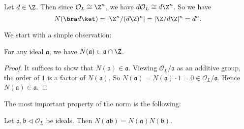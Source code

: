 \documentclass[a4paper]{article}
\begin{document}
\begin{eg}
  Let $d \in \Z$. Then since $\mathcal{O}_L \cong \Z^n$, we have $d \mathcal{O}_L \cong d \Z^n$. So we have
  \[
    N(\bra d\ket) = |\Z^n/(d\Z)^n| = |\Z/d\Z|^n = d^n.
  \]
\end{eg}

We start with a simple observation:
\begin{prop}
  For any ideal $\mathfrak{a}$, we have $N(\mathfrak{a}) \in \mathfrak{a} \cap \Z$.
\end{prop}

\begin{proof}
  It suffices to show that $N(\mathfrak{a}) \in \mathfrak{a}$. Viewing $\mathcal{O}_L/\mathfrak{a}$ as an additive group, the order of $1$ is a factor of $N(\mathfrak{a})$. So $N(\mathfrak{a}) = N(\mathfrak{a}) \cdot 1 = 0 \in \mathcal{O}_L/\mathfrak{a}$. Hence $N(\mathfrak{a}) \in \mathfrak{a}$.
\end{proof}

The most important property of the norm is the following:
\begin{prop}
  Let $\mathfrak{a}, \mathfrak{b} \lhd \mathcal{O}_L$ be ideals. Then $N(\mathfrak{a} \mathfrak{b}) = N(\mathfrak{a})N(\mathfrak{b})$.
\end{prop}
\end{document}
